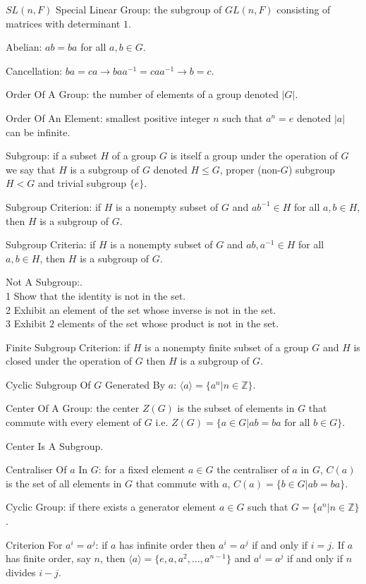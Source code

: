 $SL(n,F)$ Special Linear Group: the subgroup of $GL(n,F)$ consisting of matrices with determinant $1$.

Abelian: $ab=ba$ for all $a,b \in G$.

Cancellation: $ba=ca \to baa^{-1}=caa^{-1} \to b=c$.

Order Of A Group: the number of elements of a group denoted $|G|$.

Order Of An Element: smallest positive integer $n$ such that $a^n=e$ denoted $|a|$ can be infinite.

Subgroup: if a subset $H$ of a group $G$ is itself a group under the operation of $G$ we say that $H$ is a subgroup of $G$ denoted $H \le G$, proper (non-$G$) subgroup $H < G$ and trivial subgroup $\{e \}$.

Subgroup Criterion: if $H$ is a nonempty subset of $G$ and $ab^{-1} \in H$ for all $a,b \in H$, then $H$ is a subgroup of $G$.

Subgroup Criteria: if $H$ is a nonempty subset of $G$ and $ab,a^{-1} \in H$ for all $a,b \in H$, then $H$ is a subgroup of $G$.

Not A Subgroup:. \\
1 Show that the identity is not in the set. \\
2 Exhibit an element of the set whose inverse is not in the set. \\
3 Exhibit $2$ elements of the set whose product is not in the set.

Finite Subgroup Criterion: if $H$ is a nonempty finite subset of a group $G$ and $H$ is closed under the operation of $G$ then $H$ is a subgroup of $G$.

Cyclic Subgroup Of $G$ Generated By $a$: $\langle a \rangle = \{ a^n | n \in \mathbb{Z} \}$.

Center Of A Group: the center $Z(G)$ is the subset of elements in $G$ that commute with every element of $G$ i.e. $Z(G) = \{ a \in G | ab=ba \text{ for all } b \in G \}$.

Center Is A Subgroup.

Centraliser Of $a$ In $G$: for a fixed element $a \in G$ the centraliser of $a$ in $G$, $C(a)$ is the set of all elements in $G$ that commute with $a$, $C(a) = \{ b \in G | ab=ba \}$.

Cyclic Group: if there exists a generator element $a \in G$ such that $G = \{ a^n | n \in \mathbb{Z} \}$.

Criterion For $a^i = a^j$: if $a$ has infinite order then $a^i=a^j$ if and only if $i=j$. If $a$ has finite order, say $n$, then $\langle a \rangle = \{ e,a,a^2,\dots,a^{n-1} \}$ and $a^i = a^j$ if and only if $n$ divides $i-j$.

